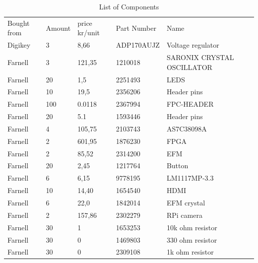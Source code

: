 
\begin{table}[]
\centering
\caption{List of Components}
\label{listofcomponents}
\begin{tabular}{lllll}
Bought from & Amount & price kr/unit & Part Number            & Name                        \\
Digikey     & 3      & 8,66          & ADP170AUJZ & Voltage regulator           \\
Farnell     & 3      & 121,35        & 1210018                & SARONIX  CRYSTAL OSCILLATOR \\
Farnell     & 20     & 1,5           & 2251493                & LEDS                        \\
Farnell     & 10     & 19,5          & 2356206                & Header pins                 \\
Farnell     & 100    & 0.0118        & 2367994                & FPC-HEADER                  \\
Farnell     & 20     & 5.1           & 1593446                & Header pins                 \\
Farnell     & 4      & 105,75        & 2103743                & AS7C38098A                  \\
Farnell     & 2      & 601,95        & 1876230                & FPGA                        \\
Farnell     & 2      & 85,52         & 2314200                & EFM                         \\
Farnell     & 20     & 2,45          & 1217764                & Button                      \\
Farnell     & 6      & 6,15          & 9778195                & LM1117MP-3.3                \\
Farnell     & 10     & 14,40         & 1654540                & HDMI                        \\
Farnell     & 6      & 22,0          & 1842014                & EFM crystal                 \\
Farnell     & 2      & 157,86        & 2302279                & RPi camera                  \\
Farnell     & 30     & 1             & 1653253                & 10k ohm resistor            \\
Farnell     & 30     & 0             & 1469803                & 330 ohm resistor            \\
Farnell     & 30     & 0             & 2309108                & 1k ohm resistor             \\

\end{tabular}
\end{table}
